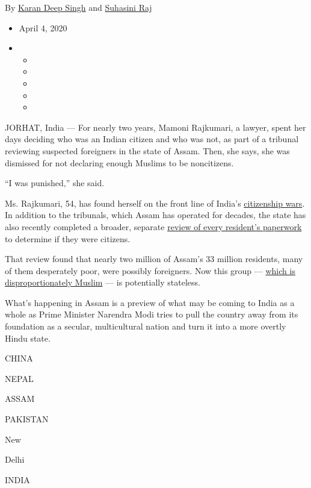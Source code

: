 By \href{https://www.nytimes.com/by/karan-deep-singh}{Karan Deep Singh}
and \href{https://www.nytimes.com/by/suhasini-raj}{Suhasini Raj}

\begin{itemize}
\item
  April 4, 2020
\item
  \begin{itemize}
  \item
  \item
  \item
  \item
  \item
  \end{itemize}
\end{itemize}

JORHAT, India --- For nearly two years, Mamoni Rajkumari, a lawyer,
spent her days deciding who was an Indian citizen and who was not, as
part of a tribunal reviewing suspected foreigners in the state of Assam.
Then, she says, she was dismissed for not declaring enough Muslims to be
noncitizens.

``I was punished,'' she said.

Ms. Rajkumari, 54, has found herself on the front line of India's
\href{https://www.nytimes.com/2019/12/22/world/asia/modi-india-citizenship-law.html}{citizenship
wars}. In addition to the tribunals, which Assam has operated for
decades, the state has also recently completed a broader, separate
\href{https://www.nytimes.com/2019/08/17/world/asia/india-muslims-narendra-modi.html}{review
of every resident's paperwork} to determine if they were citizens.

That review found that nearly two million of Assam's 33 million
residents, many of them desperately poor, were possibly foreigners. Now
this group --- \href{https://www.youtube.com/watch?v=F1eAFpLLcXk}{which
is disproportionately Muslim} --- is potentially stateless.

What's happening in Assam is a preview of what may be coming to India as
a whole as Prime Minister Narendra Modi tries to pull the country away
from its foundation as a secular, multicultural nation and turn it into
a more overtly Hindu state.

CHINA

NEPAL

ASSAM

PAKISTAN

New

Delhi

INDIA

